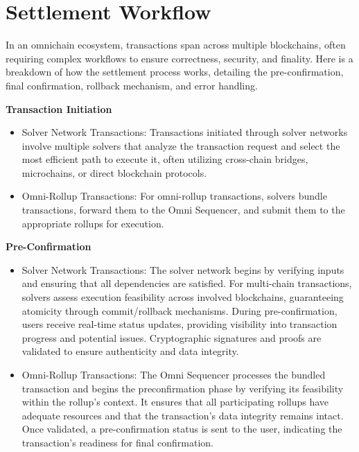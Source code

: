 
\section{Settlement Workflow}

In an omnichain ecosystem, transactions span across multiple blockchains, often requiring complex workflows to ensure correctness, security, and finality. Here is a breakdown of how the settlement process works, detailing the pre-confirmation, final confirmation, rollback mechanism, and error handling.

\textbf{Transaction Initiation}
\begin{itemize}
    \item Solver Network Transactions: Transactions initiated through solver networks involve multiple solvers that analyze the transaction request and select the most efficient path to execute it, often utilizing cross-chain bridges, microchains, or direct blockchain protocols.
    \item Omni-Rollup Transactions: For omni-rollup transactions, solvers bundle transactions, forward them to the Omni Sequencer, and submit them to the appropriate rollups for execution.
\end{itemize}


\textbf{Pre-Confirmation} 
\begin{itemize}
    \item Solver Network Transactions: The solver network begins by verifying inputs and ensuring that all dependencies are satisfied. For multi-chain transactions, solvers assess execution feasibility across involved blockchains, guaranteeing atomicity through commit/rollback mechanisms. During pre-confirmation, users receive real-time status updates, providing visibility into transaction progress and potential issues. Cryptographic signatures and proofs are validated to ensure authenticity and data integrity.
  
    \item Omni-Rollup Transactions: The Omni Sequencer processes the bundled transaction and begins the preconfirmation phase by verifying its feasibility within the rollup's context. It ensures that all participating rollups have adequate resources and that the transaction's data integrity remains intact. Once validated, a pre-confirmation status is sent to the user, indicating the transaction's readiness for final confirmation.
\end{itemize}



